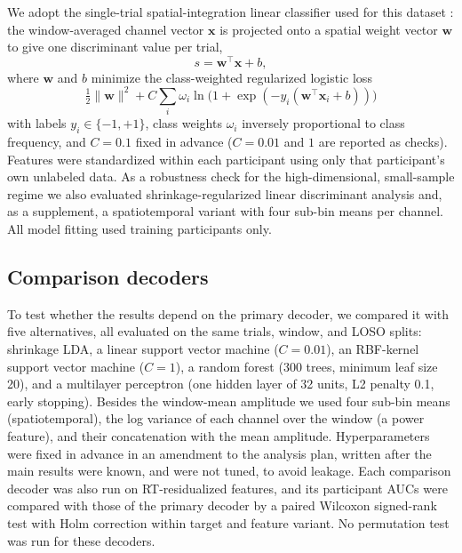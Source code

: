 \documentclass[11pt,a4paper]{article}
\begin{document}
We adopt the single-trial spatial-integration linear classifier used for this dataset \cite{r2,r10,r12}: the window-averaged channel vector $\mathbf{x}$ is projected onto a spatial weight vector $\mathbf{w}$ to give one discriminant value per trial,
\begin{equation}
s=\mathbf{w}^{\top}\mathbf{x}+b,
\label{eq:score}
\end{equation}
where $\mathbf{w}$ and $b$ minimize the class-weighted regularized logistic loss
\begin{equation}
\tfrac{1}{2}\lVert\mathbf{w}\rVert^{2}+C\sum_{i}\omega_i\ln\!\bigl(1+\exp(-y_i(\mathbf{w}^{\top}\mathbf{x}_i+b))\bigr)
\label{eq:loss}
\end{equation}
with labels $y_i\in\{-1,+1\}$, class weights $\omega_i$ inversely proportional to class frequency, and $C=0.1$ fixed in advance ($C=0.01$ and $1$ are reported as checks). Features were standardized within each participant using only that participant's own unlabeled data. As a robustness check for the high-dimensional, small-sample regime we also evaluated shrinkage-regularized linear discriminant analysis \cite{r24,r25} and, as a supplement, a spatiotemporal variant with four sub-bin means per channel. All model fitting used training participants only.

\subsection{Comparison decoders}

To test whether the results depend on the primary decoder, we compared it with five alternatives, all evaluated on the same trials, window, and LOSO splits: shrinkage LDA, a linear support vector machine ($C=0.01$), an RBF-kernel support vector machine ($C=1$), a random forest (300 trees, minimum leaf size 20), and a multilayer perceptron (one hidden layer of 32 units, L2 penalty 0.1, early stopping). Besides the window-mean amplitude we used four sub-bin means (spatiotemporal), the log variance of each channel over the window (a power feature), and their concatenation with the mean amplitude. Hyperparameters were fixed in advance in an amendment to the analysis plan, written after the main results were known, and were not tuned, to avoid leakage. Each comparison decoder was also run on RT-residualized features, and its participant AUCs were compared with those of the primary decoder by a paired Wilcoxon signed-rank test with Holm correction within target and feature variant. No permutation test was run for these decoders.
\end{document}
